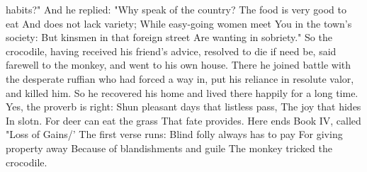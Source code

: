 \documentclass{book}
\begin{document}
habits?"
And he replied: "Why speak of the country?
The food is very good to eat
And does not lack variety;
While easy-going women meet
You in the town's society:
But kinsmen in that foreign street
Are wanting in sobriety."
So the crocodile, having received his friend's
advice, resolved to die if need be, said farewell to
the monkey, and went to his own house. There he
joined battle with the desperate ruffian who had
forced a way in, put his reliance in resolute valor,
and killed him. So he recovered his home and lived
there happily for a long time.
Yes, the proverb is right:
Shun pleasant days that listless pass,
The joy that hides
In slotn. For deer can eat the grass
That fate provides.
Here ends Book IV, called "Loss of Gains/' The
first verse runs:
Blind folly always has to pay
For giving property away
Because of blandishments and guile
The monkey tricked the crocodile.
\end{document}
